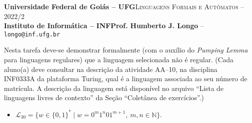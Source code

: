 \documentclass[12pt]{article}
\def\discente{Rafael Nunes Moreira Costa}
\def\matricula{202107855}
\def\ua{10}
\def\myling{{30}} %
\begin{document}
 \begin{tcolorbox}[rounded corners, colback=blue!3, colframe=blue!40!black]
  \footnotesize\textbf{Universidade Federal de Goiás -- UFG}\hfill \textsc{Linguagens Formais e Autômatos -- 2022/2}\\
  \footnotesize\textbf{Instituto de Informática -- INF\hfill Prof. Humberto J. Longo} -- \scriptsize\texttt{longo@inf.ufg.br}
 \end{tcolorbox}\bigskip
%
\begin{tcolorbox}[rounded corners, colback=blue!2, colframe=blue!40!black, title=\textbf{Atividade AA-\ua}]
  Nesta tarefa deve-se demonstrar formalmente (com o auxílio do \emph{Pumping Lemma} para linguagens regulares) que a linguagem selecionada não é regular. (Cada aluno(a) deve consultar na descrição da atividade AA--\ua, na disciplina INF0333A da plataforma Turing, qual é a linguagem associada ao seu número de matrícula. A descrição da linguagem está disponível no arquivo ``Lista de linguagens livres de contexto'' da Seção ``Coletânea de exercícios''.)
\end{tcolorbox}\bigskip
%
\begin{tcolorbox}[rounded corners, colback=yellow!5, colframe=red!40!black, title={\discente\ (\matricula)}]
 \begin{itemize}[leftmargin=*]
  \item $\mathcal{L}_\myling = \{w\in\{0,1\}^*\mid w = 0^m1^n01^{m+1},\ m,n \in \mathbb{N} \}$.
 \end{itemize}
\end{tcolorbox}\bigskip
\end{document}
